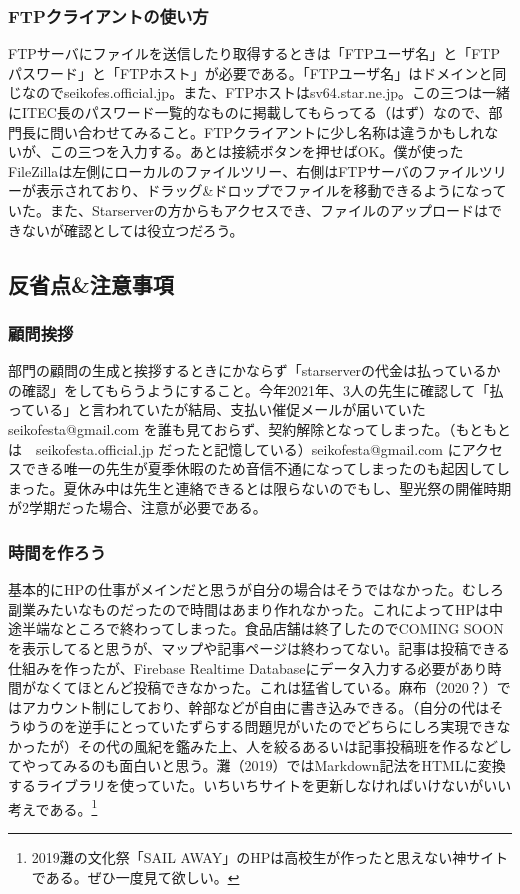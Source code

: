 \documentclass[dvipdfmx,jb5]{jarticle}
\begin{document}
\subsubsection{FTPクライアントの使い方}
FTPサーバにファイルを送信したり取得するときは「FTPユーザ名」と「FTPパスワード」と「FTPホスト」が必要である。「FTPユーザ名」はドメインと同じなのでseikofes.official.jp。また、FTPホストはsv64.star.ne.jp。この三つは一緒にITEC長のパスワード一覧的なものに掲載してもらってる（はず）なので、部門長に問い合わせてみること。FTPクライアントに少し名称は違うかもしれないが、この三つを入力する。あとは接続ボタンを押せばOK。僕が使ったFileZillaは左側にローカルのファイルツリー、右側はFTPサーバのファイルツリーが表示されており、ドラッグ\&ドロップでファイルを移動できるようになっていた。また、Starserverの方からもアクセスでき、ファイルのアップロードはできないが確認としては役立つだろう。
 \subsection{反省点\&注意事項}
 \subsubsection{顧問挨拶}
 部門の顧問の生成と挨拶するときにかならず「starserverの代金は払っているかの確認」をしてもらうようにすること。今年2021年、3人の先生に確認して「払っている」と言われていたが結局、支払い催促メールが届いていた seikofesta@gmail.com を誰も見ておらず、契約解除となってしまった。（もともとは　seikofesta.official.jp だったと記憶している）seikofesta@gmail.com にアクセスできる唯一の先生が夏季休暇のため音信不通になってしまったのも起因してしまった。夏休み中は先生と連絡できるとは限らないのでもし、聖光祭の開催時期が2学期だった場合、注意が必要である。
 \subsubsection{時間を作ろう}
 基本的にHPの仕事がメインだと思うが自分の場合はそうではなかった。むしろ副業みたいなものだったので時間はあまり作れなかった。これによってHPは中途半端なところで終わってしまった。食品店舗は終了したのでCOMING SOONを表示してると思うが、マップや記事ページは終わってない。記事は投稿できる仕組みを作ったが、Firebase Realtime Databaseにデータ入力する必要があり時間がなくてほとんど投稿できなかった。これは猛省している。麻布（2020？）ではアカウント制にしており、幹部などが自由に書き込みできる。（自分の代はそうゆうのを逆手にとっていたずらする問題児がいたのでどちらにしろ実現できなかったが）その代の風紀を鑑みた上、人を絞るあるいは記事投稿班を作るなどしてやってみるのも面白いと思う。灘（2019）ではMarkdown記法をHTMLに変換するライブラリを使っていた。いちいちサイトを更新しなければいけないがいい考えである。\footnote{2019灘の文化祭「SAIL AWAY」のHPは高校生が作ったと思えない神サイトである。ぜひ一度見て欲しい。}
\end{document}
